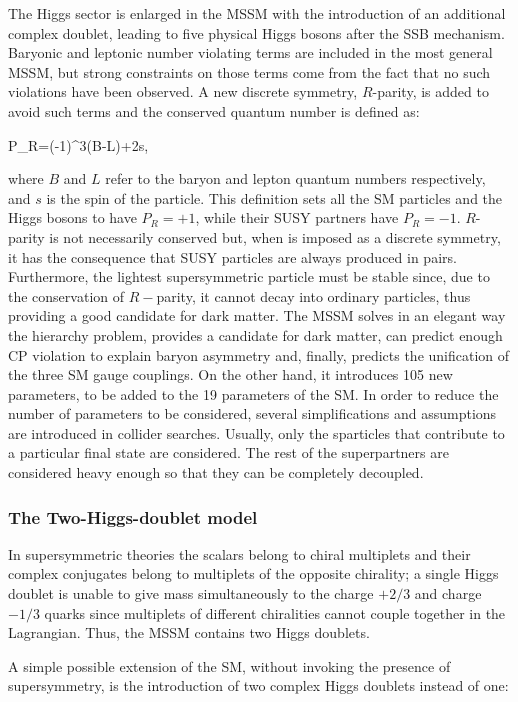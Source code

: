 The Higgs sector is enlarged in the MSSM with the introduction of an additional complex doublet, leading to five physical Higgs bosons after the SSB mechanism. Baryonic and leptonic number violating terms are included in the most general MSSM, but strong constraints on those terms come from the fact that no such violations have been observed. A new discrete symmetry, $R$-parity, is added to avoid such terms and the conserved quantum number is defined as:

\be
P_{R}=(-1)^{3(B-L)+2s},
\ee 

\noindent where $B$ and $L$ refer to the baryon and lepton quantum numbers respectively, and $s$ is the spin of the particle. This definition sets all the SM particles and the Higgs bosons to have $P_{R} = +1$, while their SUSY partners have $P_{R} =-1$. $R$-parity is not necessarily conserved but, when is imposed as a discrete symmetry, it has the consequence that SUSY particles are always produced in pairs. Furthermore, the lightest supersymmetric particle must be stable since, due to the conservation of $R-$parity, it cannot decay into ordinary particles, thus providing a good candidate for dark matter. The MSSM solves in an elegant way the hierarchy problem, provides a candidate for dark matter, can predict enough CP violation to explain baryon asymmetry and, finally, predicts the unification of the three SM gauge couplings. On the other hand, it introduces 105 new parameters, to be added to the 19 parameters of the SM. In order to reduce the number of parameters to be considered, several simplifications and assumptions are introduced in collider searches. Usually, only the sparticles that contribute to a particular final state are considered. The rest of the superpartners are considered heavy enough so that they can be completely decoupled. 

\subsubsection{The Two-Higgs-doublet model} 
\label{sec:theo:hdm}

In supersymmetric theories the scalars belong to chiral multiplets and their complex conjugates belong to multiplets of the opposite chirality; a single Higgs doublet is unable to give mass simultaneously to the charge $+2/3$ and charge $-1/3$ quarks  since multiplets of different chiralities cannot couple together in the Lagrangian. Thus, the MSSM contains two Higgs doublets.\par
A simple possible extension of the SM, without invoking the presence of supersymmetry, is the introduction of two complex Higgs doublets instead of one:

